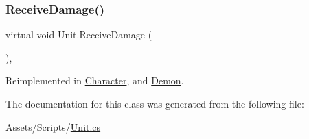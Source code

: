 \mbox{\label{class_unit_a698a459fd5eeef7fc906f4657b723fa4}} 
\subsubsection{\texorpdfstring{Receive\+Damage()}{ReceiveDamage()}}
{\footnotesize\ttfamily virtual void Unit.\+Receive\+Damage (\begin{DoxyParamCaption}{ }\end{DoxyParamCaption})\hspace{0.3cm}{\ttfamily [inline]}, {\ttfamily [virtual]}}



Reimplemented in \mbox{\hyperlink{class_character_a4c92566bccf29f534c3863eb12fddba2}{Character}}, and \mbox{\hyperlink{class_demon_a90dc4738a3cab182e3daa2da35cbbbc6}{Demon}}.



The documentation for this class was generated from the following file\+:\begin{DoxyCompactItemize}
\item 
Assets/\+Scripts/\mbox{\hyperlink{_unit_8cs}{Unit.\+cs}}\end{DoxyCompactItemize}
